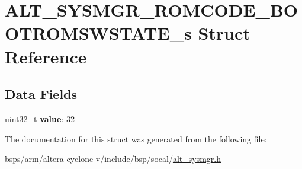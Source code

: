 \hypertarget{structALT__SYSMGR__ROMCODE__BOOTROMSWSTATE__s}{}\section{A\+L\+T\+\_\+\+S\+Y\+S\+M\+G\+R\+\_\+\+R\+O\+M\+C\+O\+D\+E\+\_\+\+B\+O\+O\+T\+R\+O\+M\+S\+W\+S\+T\+A\+T\+E\+\_\+s Struct Reference}
\label{structALT__SYSMGR__ROMCODE__BOOTROMSWSTATE__s}
\subsection*{Data Fields}
\begin{DoxyCompactItemize}
\item 
\mbox{\label{structALT__SYSMGR__ROMCODE__BOOTROMSWSTATE__s_a487d7e36a90e6497df2fbe5e995aef20}} 
uint32\+\_\+t {\bfseries value}\+: 32
\end{DoxyCompactItemize}


The documentation for this struct was generated from the following file\+:\begin{DoxyCompactItemize}
\item 
bsps/arm/altera-\/cyclone-\/v/include/bsp/socal/\mbox{\hyperlink{alt__sysmgr_8h}{alt\+\_\+sysmgr.\+h}}\end{DoxyCompactItemize}
